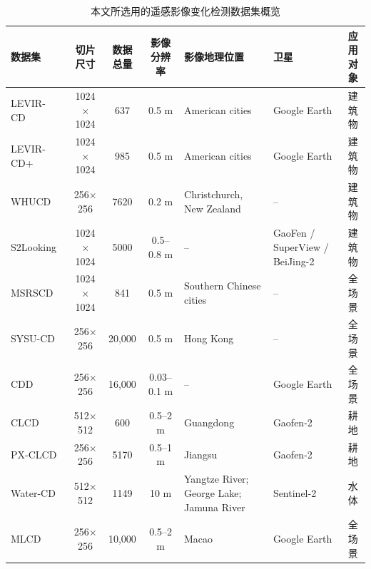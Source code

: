 \begin{table}[!htbp]
\centering
\caption{本文所选用的遥感影像变化检测数据集概览}
\label{tab:change_detection_datasets_review}
\setlength{\tabcolsep}{4pt} %
\renewcommand{\arraystretch}{1.15}
\small
\begin{tabularx}{\textwidth}{@{} l c c c X X c @{}}
\toprule
\textbf{数据集} & \textbf{切片尺寸} & \textbf{数据总量} & \textbf{影像分辨率} & \textbf{影像地理位置} & \textbf{卫星} & \textbf{应用对象} \\
\midrule
LEVIR-CD~\cite{chen_spatial-temporal_2020}   & 1024$\times$1024 & 637    & 0.5 m        & American cities                                   & Google Earth                     & 建筑物 \\
LEVIR-CD+~\cite{chen_spatial-temporal_2020}  & 1024$\times$1024 & 985    & 0.5 m        & American cities                                   & Google Earth                     & 建筑物 \\
WHUCD~\cite{Ji2019FullyCN}     & 256$\times$256   & 7620   & 0.2 m        & Christchurch, New Zealand                          & --                                & 建筑物 \\
S2Looking~\cite{Shen2021S2LookingAS}  & 1024$\times$1024 & 5000   & 0.5--0.8 m   & --                                                & GaoFen / SuperView / BeiJing-2   & 建筑物 \\
MSRSCD~\cite{Liu2025NetworkAD}     & 1024$\times$1024 & 841    & 0.5 m        & Southern Chinese cities                           & --                                & 全场景 \\
SYSU-CD~\cite{shi_deeply_2022}    & 256$\times$256   & 20{,}000 & 0.5 m       & Hong Kong                                         & --                                & 全场景 \\
CDD~\cite{Lebedev2018CHANGEDI}        & 256$\times$256   & 16{,}000 & 0.03--0.1 m & --                                                & Google Earth                     & 全场景 \\
CLCD~\cite{Liu2022ACN}       & 512$\times$512   & 600    & 0.5--2 m     & Guangdong                                         & Gaofen-2                         & 耕地 \\
PX-CLCD~\cite{miao_snunet3_2024}    & 256$\times$256   & 5170   & 0.5--1 m     & Jiangsu                                           & Gaofen-2                         & 耕地 \\
Water-CD~\cite{j_li_trsanet_2024}   & 512$\times$512   & 1149   & 10 m         & Yangtze River; George Lake; Jamuna River          & Sentinel-2                       & 水体 \\
MLCD~\cite{Huang2025SAMBasedEF}       & 256$\times$256   & 10{,}000 & 0.5--2 m    & Macao                                             & Google Earth                     & 全场景 \\
\bottomrule
\end{tabularx}
\end{table}


